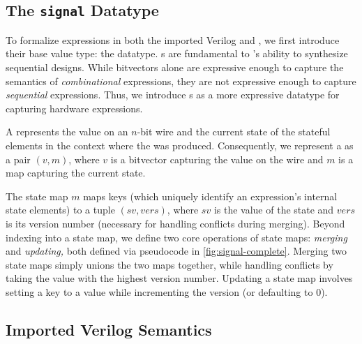   
\subsection{The \texttt{signal} Datatype}
\label{sec:signal}

To formalize
  expressions
  in both the
  imported Verilog 
  and \lrir,
  we first introduce their base value type:
  the \signal datatype.
\signal{}s are fundamental to \lr's ability
  to synthesize sequential designs.
While bitvectors alone are expressive enough
  to capture the semantics of 
  \textit{combinational} expressions,
  they are not expressive enough to capture
  \textit{sequential} expressions.
Thus, we introduce \signal{}s
  as a more expressive datatype
  for capturing hardware expressions.
  
A \signal represents
  the value on an $n$-bit
  wire and
  the current state
  of the stateful elements
  in the context where the \signal
  was produced.
Consequently, we represent a
  \signal{} as a pair $(v,m)$,
  where $v$ is a bitvector
  capturing the value on the wire
  and $m$ is a map
  capturing the current state.

% 

The state map $m$
  maps keys (which uniquely identify
    an expression's internal state elements)
  to a tuple $(\mathit{sv}, \mathit{vers})$,
  where $\mathit{sv}$
  is the value of the state
  and $\mathit{vers}$ is
  its version number 
  (necessary for handling conflicts during merging).
Beyond indexing into a state map,
  we define two core operations of state maps:
  \textit{merging} and \textit{updating,}
  both defined via pseudocode
  in \cref{fig:signal-complete}.
Merging two state maps
  simply unions the two maps together,
  while handling conflicts by taking the value
  with the highest version number.
Updating a state map
  involves setting a key to a value
  while incrementing the version (or defaulting to 0).
  
  
\subsection{Imported Verilog Semantics}
\label{sec:verilog-semantics}

